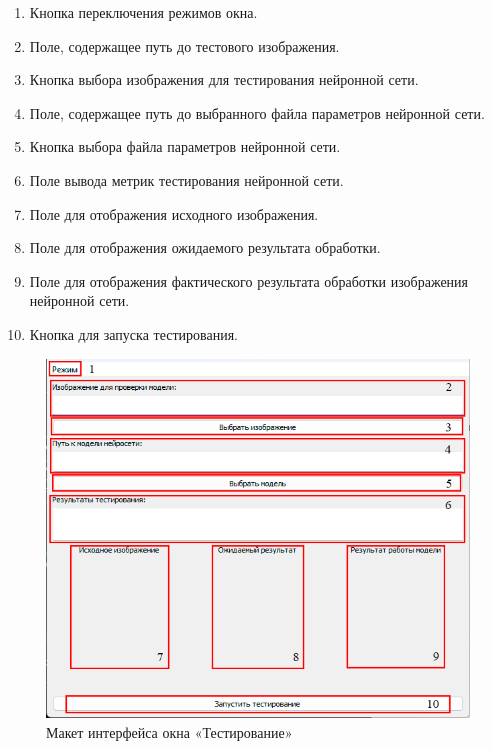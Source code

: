 \begin{enumerate}
	\item Кнопка переключения режимов окна.
	\item Поле, содержащее путь до тестового изображения.
	\item Кнопка выбора изображения для тестирования нейронной сети.
	\item Поле, содержащее путь до выбранного файла параметров нейронной сети.
	\item Кнопка выбора файла параметров нейронной сети.
	\item Поле вывода метрик тестирования нейронной сети.
	\item Поле для отображения исходного изображения.
	\item Поле для отображения ожидаемого результата обработки.
	\item Поле для отображения фактического результата обработки изображения нейронной сети.
	\item Кнопка для запуска тестирования.
\end{enumerate}

\begin{figure}[H]
	\centering
	\includegraphics[width=0.7\linewidth]{images/ui_test}
	\caption{Макет интерфейса окна «Тестирование»}
	\label{fig:uitest}
\end{figure}

\newpage